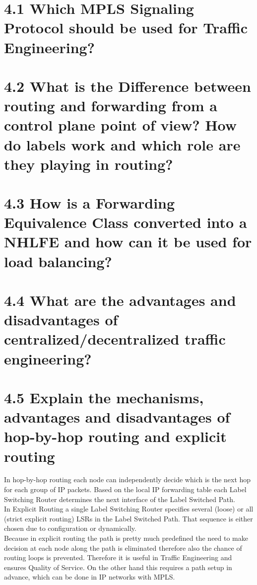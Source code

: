\documentclass{article}
\begin{document}
	\pagestyle{fancy}
	\hfill
	
	\section*{4.1 Which MPLS Signaling Protocol should be used for Traffic Engineering?}
	\begin{adjustwidth}{2em}{2em}
	\end{adjustwidth}
	
	\section*{4.2 What is the Difference between routing and forwarding from a control plane point of view? How do labels work and which role are they playing in routing?}
	\begin{adjustwidth}{2em}{2em}
	\end{adjustwidth}
	
	\section*{4.3 How is a Forwarding Equivalence Class converted into a NHLFE and how can it be used for load balancing?}
	\begin{adjustwidth}{2em}{2em}
	\end{adjustwidth}
	
	\section*{4.4 What are the advantages and disadvantages of centralized/decentralized traffic engineering?}
	\begin{adjustwidth}{2em}{2em}
	\end{adjustwidth}
	
	\section*{4.5 Explain the mechanisms, advantages and disadvantages of hop-by-hop routing and explicit routing}
	\begin{adjustwidth}{2em}{2em}
		In hop-by-hop routing each node can independently decide which is the next hop for each group of IP packets. Based on the local IP forwarding table each Label Switching Router determines the next interface of the Label Switched Path. \\
		In Explicit Routing a single Label Switching Router specifies several (loose) or all (strict explicit routing) LSRs in the Label Switched Path. That sequence is either chosen due to configuration or dynamically. \\
		Because in explicit routing the path is pretty much predefined the need to make decision at each node along the path is eliminated therefore also the chance of routing loops is prevented. Therefore it is useful in Traffic Engineering and ensures Quality of Service. On the other hand this requires a path setup in advance, which can be done in IP networks with MPLS.
	\end{adjustwidth}
	
\end{document}
